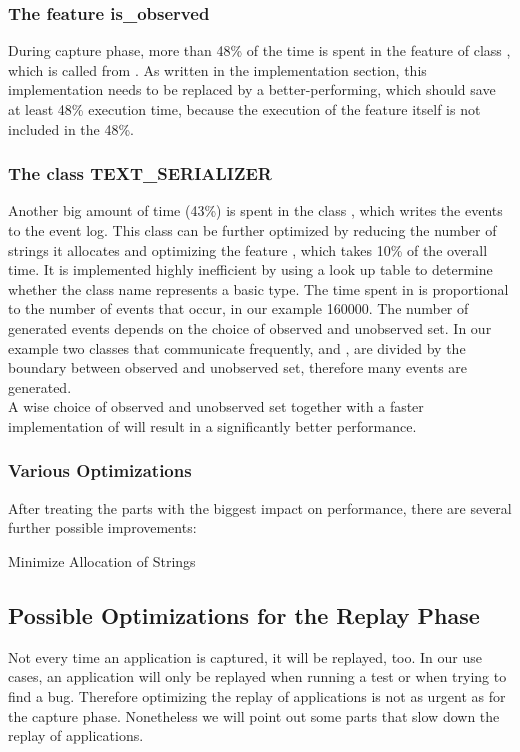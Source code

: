 \subsubsection{The feature is\_observed}
During capture phase, more than 48\% of the time is spent in the feature  of class , which is called from . As written in the implementation section, this implementation needs to be replaced by a better-performing, which should save at least 48\% execution time, because the execution of the feature  itself is not included in the 48\%.

\subsubsection{The class TEXT\_SERIALIZER}
Another big amount of time (43\%) is spent in the class , which writes the events to the event log. This class can be further optimized by reducing the number of strings it allocates and optimizing the feature , which takes 10\% of the overall time. It is implemented highly inefficient by using a look up table to determine whether the class name represents a basic type. The time spent in  is proportional to the number of events that occur, in our example 160000. The number of generated events depends on the choice of observed and unobserved set. In our example two classes that communicate frequently,  and , are divided by the boundary between observed and unobserved set, therefore many events are generated.\\
A wise choice of observed and unobserved set together with a faster implementation of  will result in a significantly better performance.

\subsubsection{Various Optimizations}
After treating the parts with the biggest impact on performance, there are several further possible improvements:

\begin{description}
 \item [Minimize Allocation of Strings]
 \item []
\end{description}


\subsection {Possible Optimizations for the Replay Phase}
Not every time an application is captured, it will be replayed, too. In our use cases, an application will only be replayed when running a test or when trying to find a bug. Therefore optimizing the replay of applications is not as urgent as for the capture phase. Nonetheless we will point out some parts that slow down the replay of applications. 


